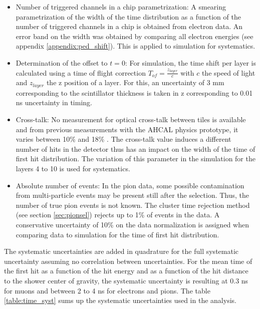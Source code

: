 \begin{itemize}
	\item Number of triggered channels in a chip parametrization: A smearing parametrization of the width of the time distribution as a function of the number of triggered channels in a chip is obtained from electron data. An error band on the width was obtained by comparing all electron energies (see appendix \ref{appendix:ped_shift}). This is applied to simulation for systematics.
	\item Determination of the offset to $t=0$: For simulation, the time shift per layer is calculated using a time of flight correction $T_{of} = \frac{z_{layer}}{c}$ with $c$ the speed of light and $z_{layer}$ the z position of a layer. For this, an uncertainty of 3 mm corresponding to the scintillator thickness is taken in z corresponding to 0.01 ns uncertainty in timing.
	\item Cross-talk: No measurement for optical cross-talk between tiles is available and from previous measurements with the AHCAL physics prototype, it varies between 10\% and 18\% \cite{Gunter:2015ika}. The cross-talk value induces a different number of hits in the detector thus has an impact on the width of the time of first hit distribution. The variation of this parameter in the simulation for the layers 4 to 10 is used for systematics.
	\item Absolute number of events: In the pion data, some possible contamination from multi-particle events may be present still after the selection. Thus, the number of true pion events is not known. The cluster time rejection method (see section \ref{sec:pionsel}) rejects up to 1\% of events in the data. A conservative uncertainty of 10\% on the data normalization is assigned when comparing data to simulation for the time of first hit distribution.
\end{itemize}

The systematic uncertainties are added in quadrature for the full systematic uncertainty assuming no correlation between uncertainties. For the mean time of the first hit as a function of the hit energy and as a function of the hit distance to the shower center of gravity, the systematic uncertainty is resulting at 0.3 ns for muons and between 2 to 4 ns for electrons and pions. The table \ref{table:time_syst} sums up the systematic uncertainties used in the analysis.

